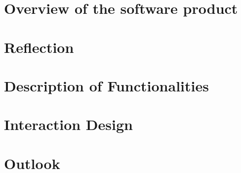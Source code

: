 \chapter{Overview of the software product}

\chapter{Reflection}

\chapter{Description of Functionalities}

\chapter{Interaction Design}



\chapter{Outlook}